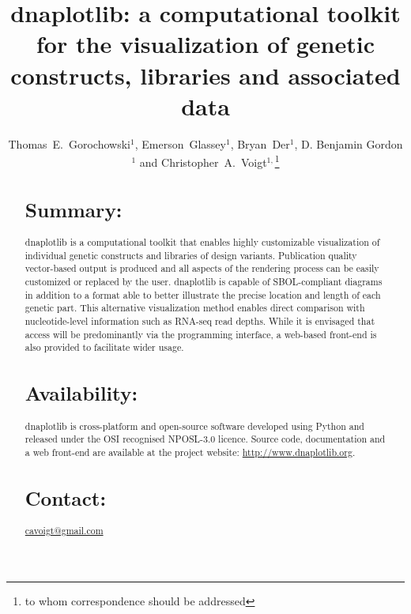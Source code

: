 \documentclass{bioinfo}
\begin{document}

\title[dnaplotlib]{dnaplotlib: a computational toolkit for the visualization of genetic constructs, libraries and associated data}
\author[Thomas E. Gorochowski \textit{et~al}]{Thomas~E.~Gorochowski$^{1}$, Emerson~Glassey$^{1}$, Bryan~Der$^{1}$, D. Benjamin Gordon$^{1}$ and Christopher~A.~Voigt$^{1,}$\footnote{to whom correspondence should be addressed}}
\address{$^{1}$Department of Biological Engineering, Synthetic Biology Center, Massachusetts Institute of Technology, USA.}



\maketitle

\begin{abstract}

\section{Summary:}
dnaplotlib is a computational toolkit that enables highly customizable visualization of individual genetic constructs and libraries of design variants. Publication quality vector-based output is produced and all aspects of the rendering process can be easily customized or replaced by the user. dnaplotlib is capable of SBOL-compliant diagrams in addition to a format able to better illustrate the precise location and length of each genetic part. This alternative visualization method enables direct comparison with nucleotide-level information such as RNA-seq read depths. While it is envisaged that access will be predominantly via the programming interface, a web-based front-end is also provided to facilitate wider usage.

\section{Availability:}
dnaplotlib is cross-platform and open-source software developed using Python and released under the OSI recognised NPOSL-3.0 licence. Source code, documentation and a web front-end are available at the project website: \href{http://www.dnaplotlib.org}{http://www.dnaplotlib.org}.

\section{Contact:} \href{cavoigt@gmail.com}{cavoigt@gmail.com}
\end{abstract}
\end{document}
